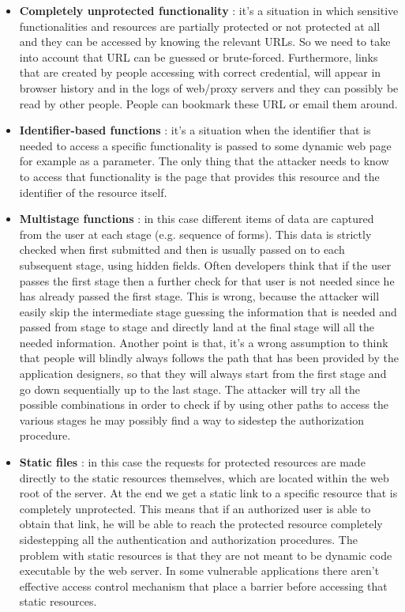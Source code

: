 \begin{itemize}
\item \textbf{Completely unprotected functionality} : it's a situation in which sensitive functionalities and resources are partially protected or not protected at all and they can be accessed by knowing the relevant URLs. So we need to take into account that URL can be guessed or brute-forced. Furthermore, links that are created by people accessing with correct credential, will appear in browser history and in the logs of web/proxy servers and they can possibly be read by other people. People can bookmark these URL or email them around.
\item \textbf{Identifier-based functions} : it's a situation when the identifier that is needed to access a specific functionality is passed to some dynamic web page for example as a parameter. The only thing that the attacker needs to know to access that functionality is the page that provides this resource and the identifier of the resource itself.
\item \textbf{Multistage functions} : in this case different items of data are captured from the user at each stage (e.g. sequence of forms). This data is strictly checked when first submitted and then is usually passed on to each subsequent stage, using hidden fields. Often developers think that if the user passes the first stage then a further check for that user is not needed since he has already passed the first stage. This is wrong, because the attacker will easily skip the intermediate stage guessing the information that is needed and passed from stage to stage and directly land at the final stage will all the needed information. Another point is that, it's a wrong assumption to think that people will blindly always follows the path that has been provided by the application designers, so that they will always start from the first stage and go down sequentially up to the last stage. The attacker will try all the possible combinations in order to check if by using other paths to access the various stages he may possibly find a way to sidestep the authorization procedure.
\item \textbf{Static files} : in this case the requests for protected resources are made directly to the static resources themselves, which are located within the web root of the server. At the end we get a static link to a specific resource that is completely unprotected. This means that if an authorized user is able to obtain that link, he will be able to reach the protected resource completely sidestepping all the authentication and authorization procedures. The problem with static resources is that they are not meant to be dynamic code executable by the web server. In some vulnerable applications there aren't effective access control mechanism that place a barrier before accessing that static resources.
\end{itemize}

